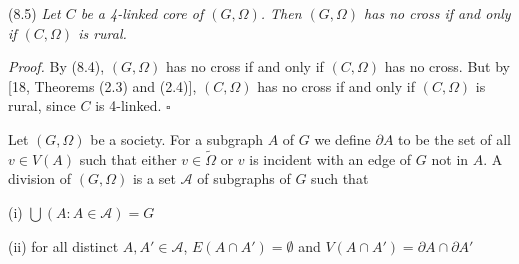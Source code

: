 \stmt
(8.5) \textit{Let $C$ be a 4-linked core of $(G, \Omega)$. Then $(G, \Omega)$ has no cross if and only if $(C, \Omega)$ is rural.}

\textit{Proof.} By (8.4), $(G, \Omega)$ has no cross if and only if $(C, \Omega)$ has no cross. But by [18, Theorems (2.3) and (2.4)], $(C, \Omega)$ has no cross if and only if $(C, \Omega)$ is rural, since $C$ is 4-linked. $\square$

Let $(G, \Omega)$ be a society. For a subgraph $A$ of $G$ we define $\partial A$ to be the set of all $v \in V(A)$ such that either $v \in \tilde{\Omega}$ or $v$ is incident with an edge of $G$ not in $A$. A division of $(G, \Omega)$ is a set $\mathcal{A}$ of subgraphs of $G$ such that

\hspace*{12pt}(i) $\bigcup(A : A \in \mathcal{A}) = G$

\hspace*{12pt}(ii) for all distinct $A, A' \in \mathcal{A}$, $E(A \cap A') = \emptyset$ and $V(A \cap A') = \partial A \cap \partial A'$

